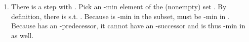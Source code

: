 \begin{isabellebody}
\begin{isamarkuptext}
%
\begin{enumerate}%
\item There is a step  with .
Pick an -min element  of the (nonempty) set .
By definition, there is  s.t. . Because  is -min in the
subset,  must be -min in . Because  has an -predecessor, it cannot
have an -successor and is thus -min in  as well.


\end{enumerate}
\end{isamarkuptext}
\end{isabellebody}
